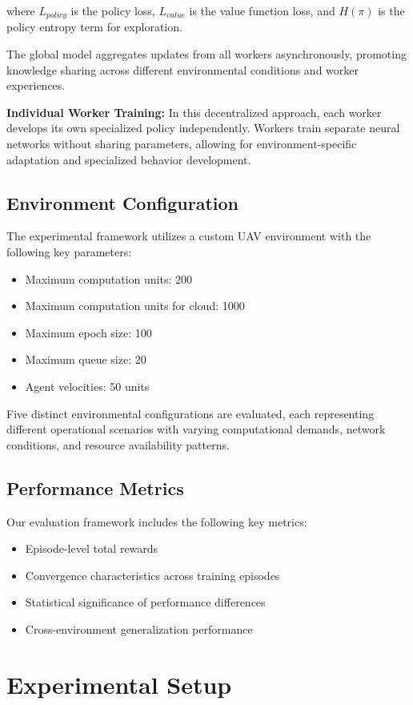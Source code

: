 \documentclass[journal]{IEEEtran}
\begin{document}
where $L_{policy}$ is the policy loss, $L_{value}$ is the value function loss, and $H(\pi)$ is the policy entropy term for exploration.

The global model aggregates updates from all workers asynchronously, promoting knowledge sharing across different environmental conditions and worker experiences.

\textbf{Individual Worker Training:} In this decentralized approach, each worker develops its own specialized policy independently. Workers train separate neural networks without sharing parameters, allowing for environment-specific adaptation and specialized behavior development.

\subsection{Environment Configuration}

The experimental framework utilizes a custom UAV environment with the following key parameters:
\begin{itemize}
\item Maximum computation units: 200
\item Maximum computation units for cloud: 1000
\item Maximum epoch size: 100
\item Maximum queue size: 20
\item Agent velocities: 50 units
\end{itemize}

Five distinct environmental configurations are evaluated, each representing different operational scenarios with varying computational demands, network conditions, and resource availability patterns.

\subsection{Performance Metrics}
Our evaluation framework includes the following key metrics:
\begin{itemize}
\item Episode-level total rewards
\item Convergence characteristics across training episodes
\item Statistical significance of performance differences
\item Cross-environment generalization performance
\end{itemize}

\section{Experimental Setup}
\label{sec:experimental_setup}
\end{document}
